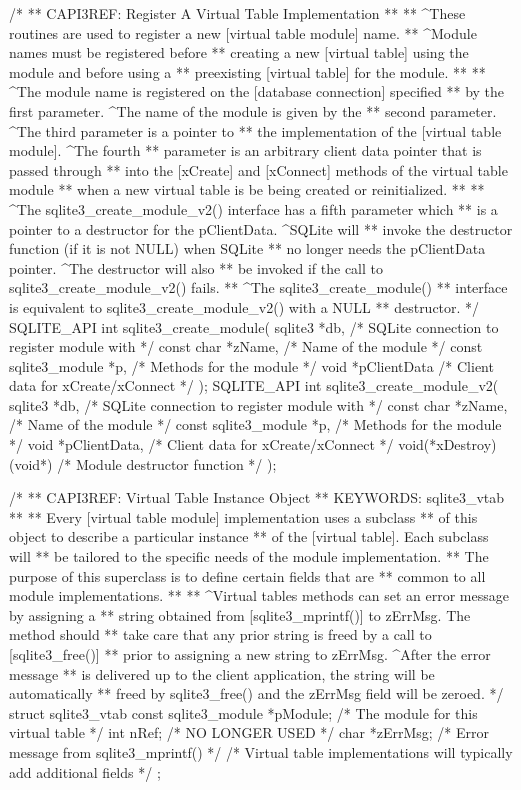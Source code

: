 \begin{Codex}[label=sqlite3.h,numbers=left]
{/*
** CAPI3REF: Register A Virtual Table Implementation
**
** ^These routines are used to register a new [virtual table module] name.
** ^Module names must be registered before
** creating a new [virtual table] using the module and before using a
** preexisting [virtual table] for the module.
**
** ^The module name is registered on the [database connection] specified
** by the first parameter.  ^The name of the module is given by the 
** second parameter.  ^The third parameter is a pointer to
** the implementation of the [virtual table module].   ^The fourth
** parameter is an arbitrary client data pointer that is passed through
** into the [xCreate] and [xConnect] methods of the virtual table module
** when a new virtual table is be being created or reinitialized.
**
** ^The sqlite3_create_module_v2() interface has a fifth parameter which
** is a pointer to a destructor for the pClientData.  ^SQLite will
** invoke the destructor function (if it is not NULL) when SQLite
** no longer needs the pClientData pointer.  ^The destructor will also
** be invoked if the call to sqlite3_create_module_v2() fails.
** ^The sqlite3_create_module()
** interface is equivalent to sqlite3_create_module_v2() with a NULL
** destructor.
*/
SQLITE_API int sqlite3_create_module(
  sqlite3 *db,               /* SQLite connection to register module with */
  const char *zName,         /* Name of the module */
  const sqlite3_module *p,   /* Methods for the module */
  void *pClientData          /* Client data for xCreate/xConnect */
);
SQLITE_API int sqlite3_create_module_v2(
  sqlite3 *db,               /* SQLite connection to register module with */
  const char *zName,         /* Name of the module */
  const sqlite3_module *p,   /* Methods for the module */
  void *pClientData,         /* Client data for xCreate/xConnect */
  void(*xDestroy)(void*)     /* Module destructor function */
);

/*
** CAPI3REF: Virtual Table Instance Object
** KEYWORDS: sqlite3_vtab
**
** Every [virtual table module] implementation uses a subclass
** of this object to describe a particular instance
** of the [virtual table].  Each subclass will
** be tailored to the specific needs of the module implementation.
** The purpose of this superclass is to define certain fields that are
** common to all module implementations.
**
** ^Virtual tables methods can set an error message by assigning a
** string obtained from [sqlite3_mprintf()] to zErrMsg.  The method should
** take care that any prior string is freed by a call to [sqlite3_free()]
** prior to assigning a new string to zErrMsg.  ^After the error message
** is delivered up to the client application, the string will be automatically
** freed by sqlite3_free() and the zErrMsg field will be zeroed.
*/
struct sqlite3_vtab {
  const sqlite3_module *pModule;  /* The module for this virtual table */
  int nRef;                       /* NO LONGER USED */
  char *zErrMsg;                  /* Error message from sqlite3_mprintf() */
  /* Virtual table implementations will typically add additional fields */
};

}
\end{Codex}
